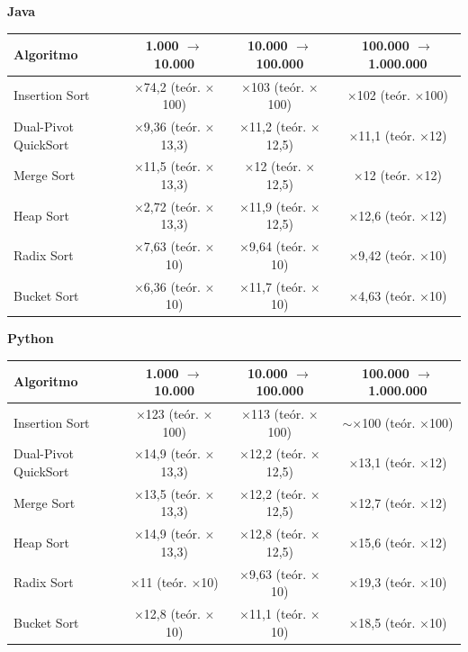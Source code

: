 \textbf{Java}\par\smallskip
{\footnotesize
\begin{tabular}{lccc}
\toprule
Algoritmo & 1.000 $\to$ 10.000 & 10.000 $\to$ 100.000 & 100.000 $\to$ 1.000.000 \\
\midrule
Insertion Sort & $\times$74,2 (te\'or. $\times$100) & $\times$103 (te\'or. $\times$100) & $\times$102 (te\'or. $\times$100) \\
Dual-Pivot QuickSort & $\times$9,36 (te\'or. $\times$13,3) & $\times$11,2 (te\'or. $\times$12,5) & $\times$11,1 (te\'or. $\times$12) \\
Merge Sort & $\times$11,5 (te\'or. $\times$13,3) & $\times$12 (te\'or. $\times$12,5) & $\times$12 (te\'or. $\times$12) \\
Heap Sort & $\times$2,72 (te\'or. $\times$13,3) & $\times$11,9 (te\'or. $\times$12,5) & $\times$12,6 (te\'or. $\times$12) \\
Radix Sort & $\times$7,63 (te\'or. $\times$10) & $\times$9,64 (te\'or. $\times$10) & $\times$9,42 (te\'or. $\times$10) \\
Bucket Sort & $\times$6,36 (te\'or. $\times$10) & $\times$11,7 (te\'or. $\times$10) & $\times$4,63 (te\'or. $\times$10) \\
\bottomrule
\end{tabular}}\par
\medskip
\textbf{Python}\par\smallskip
{\footnotesize
\begin{tabular}{lccc}
\toprule
Algoritmo & 1.000 $\to$ 10.000 & 10.000 $\to$ 100.000 & 100.000 $\to$ 1.000.000 \\
\midrule
Insertion Sort & $\times$123 (te\'or. $\times$100) & $\times$113 (te\'or. $\times$100) & $\sim$$\times$100 (te\'or. $\times$100) \\
Dual-Pivot QuickSort & $\times$14,9 (te\'or. $\times$13,3) & $\times$12,2 (te\'or. $\times$12,5) & $\times$13,1 (te\'or. $\times$12) \\
Merge Sort & $\times$13,5 (te\'or. $\times$13,3) & $\times$12,2 (te\'or. $\times$12,5) & $\times$12,7 (te\'or. $\times$12) \\
Heap Sort & $\times$14,9 (te\'or. $\times$13,3) & $\times$12,8 (te\'or. $\times$12,5) & $\times$15,6 (te\'or. $\times$12) \\
Radix Sort & $\times$11 (te\'or. $\times$10) & $\times$9,63 (te\'or. $\times$10) & $\times$19,3 (te\'or. $\times$10) \\
Bucket Sort & $\times$12,8 (te\'or. $\times$10) & $\times$11,1 (te\'or. $\times$10) & $\times$18,5 (te\'or. $\times$10) \\
\bottomrule
\end{tabular}}\par
\medskip
